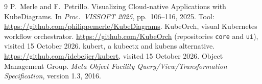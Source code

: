 \documentclass[10pt, a4paper, oneside]{article}
\begin{document}
\hypersetup{pageanchor=false}

\hypersetup{pageanchor=true}
\setcounter{tocdepth}{2}
\tableofcontents

\newpage
{}







\begin{thebibliography}{9}
 P.~Merle and F.~Petrillo. Visualizing Cloud-native
  Applications with KubeDiagrams. In \emph{Proc.\ VISSOFT 2025}, pp.~106--116,
  2025. Tool: \url{https://github.com/philippemerle/KubeDiagrams}.
 KubeOrch, visual Kubernetes workflow orchestrator.
  \url{https://github.com/KubeOrch} (repositories \texttt{core} and
  \texttt{ui}), visited 15 October 2026.
 kubert, a kubectx and kubens alternative.
  \url{https://github.com/idebeijer/kubert}, visited 15 October 2026.
 Object Management Group. \emph{Meta Object Facility
  Query/View/Transformation Specification}, version 1.3, 2016.
\end{thebibliography}

\clearpage
\appendix


\end{document}
